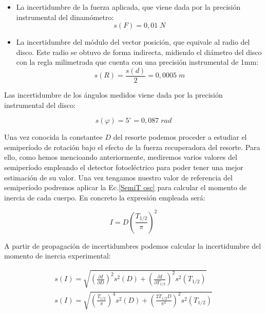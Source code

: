 \documentclass[a4paper,12pt,titlepage]{article}
\begin{document}
\begin{itemize}
    \item La incertidumbre de la fuerza aplicada, que viene dada por la precisión instrumental del dinamómetro:
    \begin{equation}
        s(F) = 0,01 \; N
    \end{equation}
    \item La incertidumbre del módulo del vector posición, que equivale al radio del disco. Este radio se obtuvo de forma indirecta, midiendo el diámetro del disco con la regla milimetrada que cuenta con una precisión instrumental de 1mm:
    \begin{equation}
        s(R) = \frac{s(d)}{2} = 0,0005 \; m
    \end{equation}
\end{itemize}

Las incertidumbre de los ángulos medidos viene dada por la precisión instrumental del disco:

\begin{equation}
    s(\varphi) = 5^\circ = 0,087 \;rad
\end{equation}

Una vez conocida la constantee $D$ del resorte podemos proceder a estudiar el semiperíodo de rotación bajo el efecto de la fuerza recuperadora del resorte. Para ello, como hemos mencioando anteriormente, mediremos varios valores del semiperíodo empleando el detector fotoeléctrico para poder tener una mejor estimación de su valor. Una vez tengamos nuestro valor de referencia del semiperíodo podremos aplicar la Ec.\ref{SemiT osc} para calcular el momento de inercia de cada cuerpo. En concreto la expresión empleada será:

\begin{equation}
    I = D \left (\frac{T_{1/2}}{\pi}\right )^2
    \label{Calculo MI figuras}
\end{equation}

A partir de propagación de incertidumbres podemos calcular la incertidumbre del momento de inercia experimental:

\begin{equation}
    \begin{gathered}
        s(I) = \sqrt{\left (\frac{\partial I}{\partial D}\right )^2s^2(D) + \left (\frac{\partial I}{\partial T_{1/2}}\right )^2s^2(T_{1/2})}\\
        s(I) = \sqrt{\left (\frac{T_{1/2}}{\pi}\right )^4s^2(D) + \left (\frac{2T_{1/2}D}{\pi^2}\right )^2s^2(T_{1/2})}
        \label{Inc MI figuras}
    \end{gathered}
\end{equation}
\end{document}
